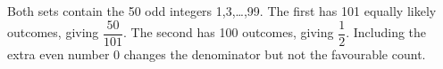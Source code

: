 Both sets contain the 50 odd integers 1,3,\ldots,99. The first has 101 equally likely outcomes, giving $\boxed{\dfrac{50}{101}}$. The second has 100 outcomes, giving $\boxed{\dfrac{1}{2}}$. Including the extra even number 0 changes the denominator but not the favourable count.
